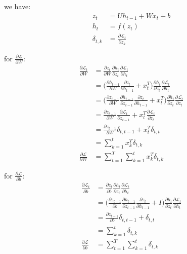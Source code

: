 \documentclass{subfiles}
\begin{document}
we have:
\begin{align*}
z_t & = U h_{t-1} + Wx_t + b \\
h_t & = f(z_t) \\
\delta_{t,k} & = \frac{\partial \mathcal{L}_t}{\partial z_k}
\end{align*}

for $\frac{\partial \mathcal{L}}{\partial W}$:
\begin{align*}
\frac{\partial \mathcal{L}_t}{\partial W}
& = \frac{\partial z_t}{\partial W}
    \frac{\partial h_t}{\partial z_t}
    \frac{\partial \mathcal{L}_t}{\partial h_t} \\
& = \big( \frac{\partial h_{t-1}}{\partial W}
          \frac{\partial z_t}{\partial h_{t-1}}
          + x_t^T \big)
    \frac{\partial h_t}{\partial z_t}
    \frac{\partial \mathcal{L}_t}{\partial h_t} \\
& = \big( \frac{\partial z_{t-1}}{\partial W}
          \frac{\partial h_{t-1}}{\partial z_{t-1}}
          \frac{\partial z_t}{\partial h_{t-1}}
          + x_t^T \big)
    \frac{\partial h_t}{\partial z_t}
    \frac{\partial \mathcal{L}_t}{\partial z_t} \\
& = \frac{\partial z_{t-1}}{\partial W}
    \frac{\partial \mathcal{L}_t}{\partial z_{t-1}}
    + x^T_t \frac{\partial \mathcal{L}_t}{\partial z_t} \\
& = \frac{\partial z_{t-1}}{\partial W} \delta_{t,t-1}
    + x^T_t \delta_{t,t} \\
& = \sum^t_{k=1} x^T_k \delta_{t,k} \\
\frac{\partial \mathcal{L}}{\partial W}
& = \sum^T_{t=1} \sum^t_{k=1} x^T_k \delta_{t,k}
\end{align*}

for $\frac{\partial \mathcal{L}}{\partial b}$:
\begin{align*}
\frac{\partial \mathcal{L}_t}{\partial b}
& = \frac{\partial z_t}{\partial b}
    \frac{\partial h_t}{\partial z_t}
    \frac{\partial \mathcal{L}_t}{\partial h_t} \\
& = \big( \frac{\partial z_{t-1}}{\partial b}
          \frac{\partial h_{t-1}}{\partial z_{t-1}}
          \frac{\partial z_t}{\partial h_{t-1}}
          + I \big)
    \frac{\partial h_t}{\partial z_t}
    \frac{\partial \mathcal{L}_t}{\partial h_t} \\
& = \frac{\partial z_{t-1}}{\partial b} \delta_{t,t-1}
    + \delta_{t,t} \\
& = \sum^t_{k=1} \delta_{t,k} \\
\frac{\partial \mathcal{L}}{\partial b}
& = \sum^T_{t=1} \sum^t_{k=1} \delta_{t,k}
\end{align*}
\end{document}
